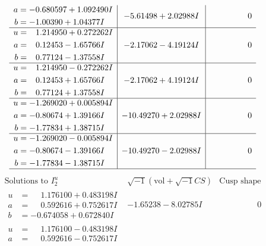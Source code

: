 \documentclass[1p]{elsarticle_modified}
\theoremstyle{definition}
\newcommand{\I}{\sqrt{-1}}
\begin{document}
$$\begin{array}{c|c|c}
\begin{aligned}
a &= -0.680597 + 1.092490 I \\
b &= -1.00390 + 1.04377 I\end{aligned}
 & -5.61498 + 2.02988 I & \phantom{-0.000000 } 0 \\ \hline\begin{aligned}
u &= \phantom{-}1.214950 + 0.272262 I \\
a &= \phantom{-}0.12453 - 1.65766 I \\
b &= \phantom{-}0.77124 - 1.37558 I\end{aligned}
 & -2.17062 - 4.19124 I & \phantom{-0.000000 } 0 \\ \hline\begin{aligned}
u &= \phantom{-}1.214950 - 0.272262 I \\
a &= \phantom{-}0.12453 + 1.65766 I \\
b &= \phantom{-}0.77124 + 1.37558 I\end{aligned}
 & -2.17062 + 4.19124 I & \phantom{-0.000000 } 0 \\ \hline\begin{aligned}
u &= -1.269020 + 0.005894 I \\
a &= -0.80674 + 1.39166 I \\
b &= -1.77834 + 1.38715 I\end{aligned}
 & -10.49270 + 2.02988 I & \phantom{-0.000000 } 0 \\ \hline\begin{aligned}
u &= -1.269020 - 0.005894 I \\
a &= -0.80674 - 1.39166 I \\
b &= -1.77834 - 1.38715 I\end{aligned}
 & -10.49270 - 2.02988 I & \phantom{-0.000000 } 0\\
 \hline 
 \end{array}$$\newpage$$\begin{array}{c|c|c}  
\text{Solutions to }I^u_{2}& \I (\text{vol} + \sqrt{-1}CS) & \text{Cusp shape}\\
 \hline 
\begin{aligned}
u &= \phantom{-}1.176100 + 0.483198 I \\
a &= \phantom{-}0.592616 + 0.752617 I \\
b &= -0.674058 + 0.672840 I\end{aligned}
 & -1.65238 - 8.02785 I & \phantom{-0.000000 } 0 \\ \hline\begin{aligned}
u &= \phantom{-}1.176100 - 0.483198 I \\
a &= \phantom{-}0.592616 - 0.752617 I \\

\end{aligned}
\end{array}$$
\end{document}
